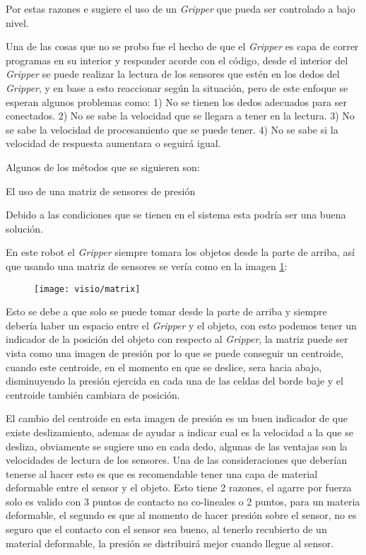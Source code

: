 Por estas razones e sugiere el uso de un \textit{Gripper} que pueda ser controlado a bajo nivel.

Una de las cosas que no se probo fue el hecho de que el \textit{Gripper} es capa de correr programas en su interior y responder acorde con el código, desde el interior del \textit{Gripper} se puede realizar la lectura de los sensores que estén en los dedos del \textit{Gripper}, y en base a esto reaccionar según la situación, pero de este enfoque se esperan algunos problemas como:
1) No se tienen los dedos adecuados para ser conectados.
2) No se sabe la velocidad que se llegara a tener en la lectura.
3) No se sabe la velocidad de procesamiento que se puede tener.
4) No se sabe si la velocidad de respuesta aumentara o seguirá igual.







Algunos de los métodos que se siguieren son:



El uso de una matriz de sensores de presión

Debido a las condiciones que se tienen en el sistema esta podría ser una buena solución.

En este robot el \textit{Gripper} siempre tomara los objetos desde la parte de arriba,  así que usando una matriz de sensores se vería como en la imagen \ref{fig:matrix}:

\begin{figure}
	\centering
	\texttt{[image: visio/matrix]}
	\caption{}
	\label{fig:matrix}
\end{figure}

Esto se debe a que solo se puede tomar desde la parte de arriba y siempre debería haber un espacio entre el \textit{Gripper} y el objeto, con esto podemos tener un indicador de la posición del objeto con respecto al \textit{Gripper}, la matriz puede ser vista como una imagen de presión por lo que se puede conseguir un centroide, cuando este centroide, en el momento en que se deslice, sera hacia abajo, disminuyendo la presión ejercida en cada una de las celdas del borde baje y el centroide también cambiara de posición.

El cambio del centroide en esta imagen de presión es un buen indicador de que existe deslizamiento, ademas de ayudar a indicar cual es la velocidad a la que se desliza, obviamente se sugiere uno en cada dedo, algunas de las ventajas son la velocidades de lectura de los sensores.
Una de las consideraciones que deberían tenerse al hacer esto es que es recomendable tener una capa de material deformable entre el sensor y el objeto. Esto tiene 2 razones, el agarre por fuerza solo es valido con 3 puntos de contacto no co-lineales o 2 puntos, para un materia deformable, el segundo es que al momento de hacer presión sobre el sensor, no es seguro que el contacto con el sensor sea bueno, al tenerlo recubierto de un material deformable, la presión se distribuirá mejor cuando llegue al sensor.


